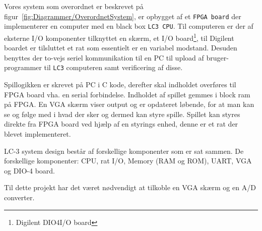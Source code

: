 Vores system som overordnet er beskrevet på figur~\vref{fig:Diagrammer/OverordnetSystem}, er opbygget af et \texttt{FPGA board} der implementerer en computer med en black box \texttt{LC3 CPU}. Til computeren er der af eksterne I/O komponenter tilknyttet en skærm, et I/O board\footnote{Digilent DIO4\texttrademark I/O board}, til Digilent boardet er tilsluttet et rat som essentielt er en variabel modstand. Desuden benyttes der to-vejs seriel kommunikation til en PC til upload af bruger-programmer til \texttt{LC3} computeren samt verificering af disse.


Spillogikken er skrevet på PC i C kode, derefter skal indholdet overføres til FPGA board vha. en serial forbindelse. Indholdet af spillet gemmes i block ram på FPGA. En VGA skærm viser output og er opdateret løbende, for at man kan se og følge med i hvad der sker og dermed kan styre spille. Spillet kan styres direkte fra FPGA board ved hjælp af en styrings enhed, denne er et rat der blevet implementeret.

LC-3 system design består af forskellige komponenter som er sat sammen. De forskellige komponenter: CPU, rat I/O, Memory (RAM og ROM), UART, VGA og DIO-4 board.

Til dette projekt har det været nødvendigt at tilkoble en VGA skærm og en A/D converter.